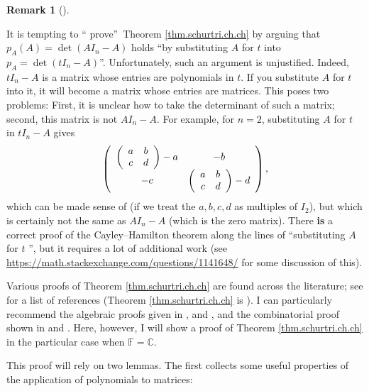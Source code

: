 \documentclass[numbers=enddot,12pt,final,onecolumn,notitlepage]{scrartcl}%
\numberwithin{exer}{subsection}
\theoremstyle{definition}
\newtheorem{remk}[theo]{Remark}
\newenvironment{remark}[1][]
{\begin{remk}[#1]\begin{leftbar}}
{\end{leftbar}\end{remk}}
\begin{document}
\begin{remark}
\label{rmk.schurtri.ch.not-that-easy}It is tempting to \textquotedblleft
prove\textquotedblright\ Theorem \ref{thm.schurtri.ch.ch} by arguing that
$p_{A}\left(  A\right)  =\det\left(  AI_{n}-A\right)  $ holds
\textquotedblleft by substituting $A$ for $t$ into $p_{A}=\det\left(
tI_{n}-A\right)  $\textquotedblright. Unfortunately, such an argument is
unjustified. Indeed, $tI_{n}-A$ is a matrix whose entries are polynomials in
$t$. If you substitute $A$ for $t$ into it, it will become a matrix whose
entries are matrices. This poses two problems: First, it is unclear how to
take the determinant of such a matrix; second, this matrix is not $AI_{n}-A$.
For example, for $n=2$, substituting $A$ for $t$ in $tI_{n}-A$ gives%
\[
\left(
\begin{array}
[c]{cc}%
\left(
\begin{array}
[c]{cc}%
a & b\\
c & d
\end{array}
\right)  -a & -b\\
-c & \left(
\begin{array}
[c]{cc}%
a & b\\
c & d
\end{array}
\right)  -d
\end{array}
\right)  ,
\]
which can be made sense of (if we treat the $a,b,c,d$ as multiples of $I_{2}%
$), but which is certainly not the same as $AI_{n}-A$ (which is the zero
matrix). There \textbf{is} a correct proof of the Cayley--Hamilton theorem
along the lines of \textquotedblleft substituting $A$ for $t$%
\textquotedblright, but it requires a lot of additional work (see
\url{https://math.stackexchange.com/questions/1141648/} for some discussion of this).
\end{remark}

Various proofs of Theorem \ref{thm.schurtri.ch.ch} are found across the
literature; see \cite[after Theorem 2.6]{trach} for a list of references
(Theorem \ref{thm.schurtri.ch.ch} is \cite[Theorem 2.5]{trach}). I can
particularly recommend the algebraic proofs given in \cite[Chapter Five,
Section IV, Lemma 1.9]{Heffer20}, \cite[\S 4, Theorem 1]{Mate16} and
\cite{Shurma15}, and the combinatorial proof shown in \cite{Straub83} and
\cite[\S 3]{Zeilbe}. Here, however, I will show a proof of Theorem
\ref{thm.schurtri.ch.ch} in the particular case when $\mathbb{F}=\mathbb{C}$.

This proof will rely on two lemmas. The first collects some useful properties
of the application of polynomials to matrices:
\end{document}
